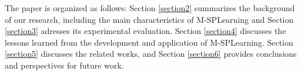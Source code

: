 



The paper is organized as follows: Section \ref{section2} summarizes the background of our research, including the main characteristics of M-SPLear\allowbreak ning and Section \ref{section3} adresses its experimental evaluation. Section \ref{section4} discusses the lessons learned from the development and application of M-SPLear\allowbreak ning. Section \ref{section5} discusses the related works, and Section \ref{section6} provides conclusions and perspectives for future work.
